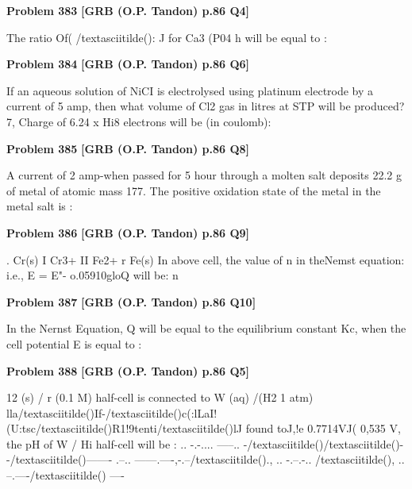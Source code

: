 \begin{problembox}
\textbf{Problem 383} \hfill \textbf{[GRB (O.P. Tandon) p.86 Q4]}
\label{q:ext-grb_all_questions-383}

The ratio Of( /textasciitilde(): J for Ca3 (P04 h will be equal to :
\end{problembox}

\begin{problembox}
\textbf{Problem 384} \hfill \textbf{[GRB (O.P. Tandon) p.86 Q6]}
\label{q:ext-grb_all_questions-384}

If an aqueous solution of NiCI is electrolysed using platinum 
electrode by a current of 5 amp, then what volume of Cl2 gas 
in litres at STP will be produced? 
7, Charge of 6.24 x Hi8 electrons will be (in coulomb):
\end{problembox}

\begin{problembox}
\textbf{Problem 385} \hfill \textbf{[GRB (O.P. Tandon) p.86 Q8]}
\label{q:ext-grb_all_questions-385}

A current of 2 amp-when passed for 5 hour through a molten 
salt deposits 22.2 g of metal of atomic mass 177. The positive 
oxidation state of the metal in the metal salt is :
\end{problembox}

\begin{problembox}
\textbf{Problem 386} \hfill \textbf{[GRB (O.P. Tandon) p.86 Q9]}
\label{q:ext-grb_all_questions-386}

. 
Cr(s) I Cr3+ II Fe2+ r Fe(s) 
In above cell, the value of n in theNemst equation: 
i.e., E = E"- o.05910gloQ will be: 
n
\end{problembox}

\begin{problembox}
\textbf{Problem 387} \hfill \textbf{[GRB (O.P. Tandon) p.86 Q10]}
\label{q:ext-grb_all_questions-387}

In the Nernst Equation, 
Q will be equal to the equilibrium constant Kc, when the cell 
potential E is equal to :
\end{problembox}

\begin{problembox}
\textbf{Problem 388} \hfill \textbf{[GRB (O.P. Tandon) p.86 Q5]}
\label{q:ext-grb_all_questions-388}

12 (s) / r (0.1 M) half-cell is connected to W (aq) /(H2 1 atm) 
lla/textasciitilde()If-/textasciitilde()c(:lLaI!(U:tsc/textasciitilde()R1!9tenti/textasciitilde()lJ  found toJ,!e 0.7714VJ( 
0,535 V, the pH of W / Hi half-cell will be : 
.. -.-.... -----.. -/textasciitilde()/textasciitilde()- -/textasciitilde()------- .--.. ------.----,-.--/textasciitilde()., .. -.--.-.. /textasciitilde(), .. --.----/textasciitilde() ----
\end{problembox}

